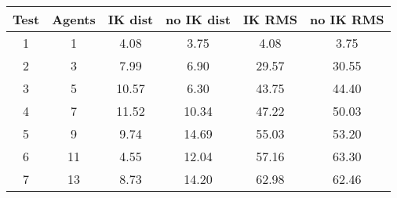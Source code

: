\begin{tabular}{|c|c|c|c|c|c|}
\hline
\textbf{Test} & \textbf{Agents} & \textbf{IK dist} & \textbf{no IK dist} & \textbf{IK RMS} & \textbf{no IK RMS} \\ \hline
1 & 1 & 4.08 & 3.75 & 4.08 & 3.75 \\
2 & 3 & 7.99 & 6.90 & 29.57 & 30.55 \\
3 & 5 & 10.57 & 6.30 & 43.75 & 44.40 \\
4 & 7 & 11.52 & 10.34 & 47.22 & 50.03 \\
5 & 9 & 9.74 & 14.69 & 55.03 & 53.20 \\
6 & 11 & 4.55 & 12.04 & 57.16 & 63.30 \\
7 & 13 & 8.73 & 14.20 & 62.98 & 62.46 \\
\hline
\end{tabular}
